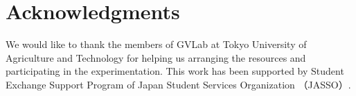 \documentclass{llncs}
\begin{document}
\section{Acknowledgments}
		We would like to thank the members of GVLab at Tokyo University of Agriculture and Technology for helping us arranging the resources and participating in the experimentation. This work has been supported by Student Exchange Support Program of Japan Student Services Organization （JASSO）.


\end{document}
